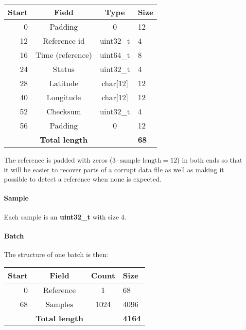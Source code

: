 \documentclass[a4paper]{article}
\begin{document}
\begin{multicols}{2}
  \begin{tabular}{|r|c|c|l|}
    \hline
    \bfseries Start   &     \bfseries Field     &   \bfseries Type
    &   \bfseries Size  \\ \hline
    0   & Padding           & 0           & 12 \\ \hline
    12  & Reference id      & uint32\_t   & 4 \\ \hline
    16  & Time (reference)  & uint64\_t   & 8 \\ \hline
    24  & Status            & uint32\_t   & 4 \\ \hline
    28  & Latitude          & char[12]    & 12 \\ \hline
    40  & Longitude         & char[12]    & 12 \\ \hline
    52  & Checksum          & uint32\_t   & 4 \\ \hline
    56  & Padding           & 0           & 12  \\ \hline
    & \textbf{Total length} &  & \textbf{68} \\ \hline
  \end{tabular}
  \label{tab:reference_binary_fields}

  \vspace{1em}

  The reference is padded with zeros ($3 \cdot \text{sample length} =
  12$) in both ends so that it will be easier to
  recover parts of a corrupt data file as well as making it possible to
  detect a reference when none is expected.

  \paragraph{Sample}Each sample is an \textbf{uint32\_t} with size 4.

  \paragraph{Batch}The structure of one
  batch is then:
  \vspace{1em}

  \begin{tabular}{|r|c|c|l|}
    \hline
    \bfseries Start   &     \bfseries Field     &   \bfseries Count
    &   \bfseries Size \\ \hline
    0   & Reference & 1 & 68 \\ \hline
    68  & Samples   & 1024 & 4096 \\ \hline
    & \textbf{Total length} &  & \textbf{4164} \\ \hline
  \end{tabular}
  \label{tab:batch_binary_fields}


\end{multicols}
\end{document}
